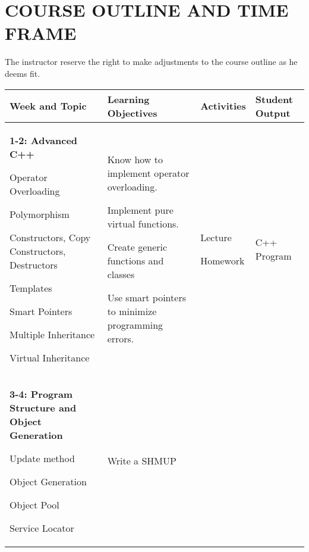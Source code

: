\documentclass[10pt]{article}
\newenvironment{itemize*}{
\begin{itemize}[leftmargin=1em,noitemsep,nolistsep]
}{\end{itemize}}
\begin{document}
\section{COURSE OUTLINE AND TIME FRAME}
The instructor reserve the right to make adjustments to the course outline as he deems fit.
\begin{longtable}{||p{1.8in}|p{2.4in}|p{1.3in}|p{1in}||}
\hline
\textbf{Week and Topic} & \textbf{Learning Objectives} & \textbf{Activities} & \textbf{Student Output} \\ \hline

\textbf{1-2: Advanced C++}	\begin{itemize*}
		\item Operator Overloading
		\item Polymorphism
		\item Constructors, Copy Constructors, Destructors
		\item Templates
		\item Smart Pointers
		\item Multiple Inheritance
		\item Virtual Inheritance
	\end{itemize*} & \begin{itemize*}
		\item Know how to implement operator overloading.
		\item Implement pure virtual functions.
		\item Create generic functions and classes
		\item Use smart pointers to minimize programming errors.
	\end{itemize*} &
	\begin{itemize*}
		\item Lecture
		\item Homework
	\end{itemize*} & C++ Program \\ \hline
\textbf{3-4: Program Structure and Object Generation} 
	\begin{itemize*}
		\item Update method
		\item Object Generation
		\item Object Pool
		\item Service Locator
	\end{itemize*} &
	\begin{itemize*}
		\item Write a SHMUP
	\end{itemize*} &
	\begin{itemize*}

\end{itemize*}
\end{longtable}
\end{document}

